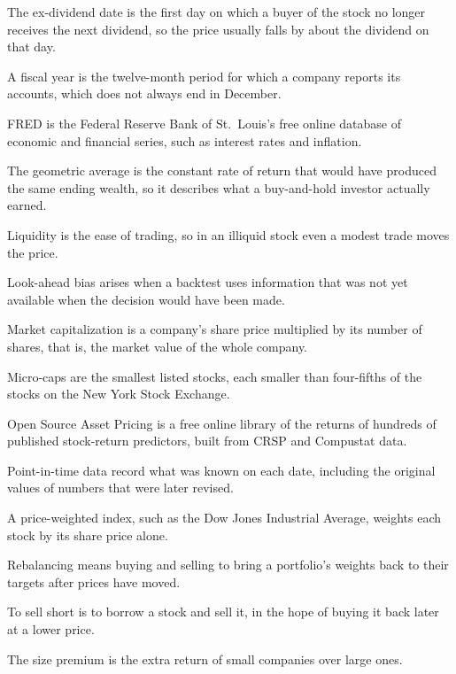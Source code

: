 \begin{keyterms}
\begin{description}[leftmargin=0pt, itemsep=0pt, parsep=0pt, topsep=0pt, font=\normalfont\bfseries\color{FEMaroon}]
  \item[Ex-dividend date.] The ex-dividend date is the first day on which a buyer of the stock no longer receives the next dividend, so the price usually falls by about the dividend on that day.
  \item[Fiscal year.] A fiscal year is the twelve-month period for which a company reports its accounts, which does not always end in December.
  \item[FRED.] FRED is the Federal Reserve Bank of St.~Louis's free online database of economic and financial series, such as interest rates and inflation.
  \item[Geometric average.] The geometric average is the constant rate of return that would have produced the same ending wealth, so it describes what a buy-and-hold investor actually earned.
  \item[Liquidity.] Liquidity is the ease of trading, so in an illiquid stock even a modest trade moves the price.
  \item[Look-ahead bias.] Look-ahead bias arises when a backtest uses information that was not yet available when the decision would have been made.
  \item[Market capitalization.] Market capitalization is a company's share price multiplied by its number of shares, that is, the market value of the whole company.
  \item[Micro-caps.] Micro-caps are the smallest listed stocks, each smaller than four-fifths of the stocks on the New York Stock Exchange.
  \item[Open Source Asset Pricing.] Open Source Asset Pricing is a free online library of the returns of hundreds of published stock-return predictors, built from CRSP and Compustat data.
  \item[Point-in-time data.] Point-in-time data record what was known on each date, including the original values of numbers that were later revised.
  \item[Price-weighted.] A price-weighted index, such as the Dow Jones Industrial Average, weights each stock by its share price alone.
  \item[Rebalancing.] Rebalancing means buying and selling to bring a portfolio's weights back to their targets after prices have moved.
  \item[Short selling.] To sell short is to borrow a stock and sell it, in the hope of buying it back later at a lower price.
  \item[Size premium.] The size premium is the extra return of small companies over large ones.

\end{description}
\end{keyterms}
